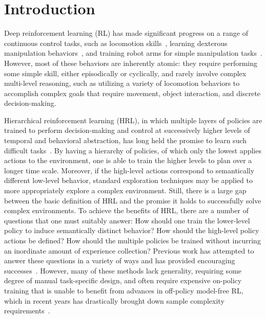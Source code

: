 \documentclass{article}
\begin{document}
\section{Introduction}
Deep reinforcement learning (RL) has made significant progress on a range of continuous control tasks, such as locomotion skills~\cite{schulman2015trust,ddpg,heess2017emergence}, %
learning dexterous manipulation behaviors~\cite{rajeswaran}, and training robot arms for simple manipulation tasks~\cite{gu2017deep,vevcerik2017leveraging}.
However, most of these behaviors are inherently atomic: they require performing some simple skill, either episodically or cyclically, and rarely involve complex multi-level reasoning, such as utilizing a variety of locomotion behaviors to accomplish complex goals that require movement, object interaction, and discrete decision-making. 

Hierarchical reinforcement learning (HRL), in which multiple layers of policies are trained to perform decision-making and control at successively higher levels of temporal and behavioral abstraction, has long held the promise to learn such difficult tasks~\cite{dayan1993feudal,parr1998reinforcement,sutton1999between,barto2003recent}.
By having a hierarchy of policies, of which only the lowest applies actions to the environment, one is able to train the higher levels to plan over a longer time scale.  Moreover, if the high-level actions correspond to semantically different low-level behavior, standard exploration techniques may be applied to more appropriately explore a complex environment.
Still, there is a large gap between the basic definition of HRL and the promise it holds to successfully solve complex environments.
To achieve the benefits of HRL, there are a number of questions that one must suitably answer:
How should one train the lower-level policy to induce semantically distinct behavior?  How should the high-level policy actions be defined?  How should the multiple policies be trained without incurring an inordinate amount of experience collection?  Previous work has attempted to answer these questions in a variety of ways and has provided encouraging successes~\cite{vezhnevets2017feudal,florensa2017stochastic,frans2017meta,heess2016learning,sigaud2018policy}.
However, many of these methods lack generality, requiring some degree of manual task-specific design, and often require expensive on-policy training that is unable to benefit from advances in off-policy model-free RL, which in recent years has drastically brought down sample complexity requirements~\cite{td3,sac,barth2018distributed}.
\end{document}
